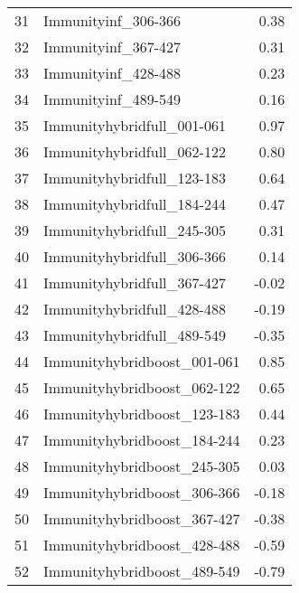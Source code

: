 \begin{table}[ht]
\begin{tabular}{rlr}
  31 & Immunityinf\_306-366 & 0.38 \\ 
  32 & Immunityinf\_367-427 & 0.31 \\ 
  33 & Immunityinf\_428-488 & 0.23 \\ 
  34 & Immunityinf\_489-549 & 0.16 \\ 
  35 & Immunityhybridfull\_001-061 & 0.97 \\ 
  36 & Immunityhybridfull\_062-122 & 0.80 \\ 
  37 & Immunityhybridfull\_123-183 & 0.64 \\ 
  38 & Immunityhybridfull\_184-244 & 0.47 \\ 
  39 & Immunityhybridfull\_245-305 & 0.31 \\ 
  40 & Immunityhybridfull\_306-366 & 0.14 \\ 
  41 & Immunityhybridfull\_367-427 & -0.02 \\ 
  42 & Immunityhybridfull\_428-488 & -0.19 \\ 
  43 & Immunityhybridfull\_489-549 & -0.35 \\ 
  44 & Immunityhybridboost\_001-061 & 0.85 \\ 
  45 & Immunityhybridboost\_062-122 & 0.65 \\ 
  46 & Immunityhybridboost\_123-183 & 0.44 \\ 
  47 & Immunityhybridboost\_184-244 & 0.23 \\ 
  48 & Immunityhybridboost\_245-305 & 0.03 \\ 
  49 & Immunityhybridboost\_306-366 & -0.18 \\ 
  50 & Immunityhybridboost\_367-427 & -0.38 \\ 
  51 & Immunityhybridboost\_428-488 & -0.59 \\ 
  52 & Immunityhybridboost\_489-549 & -0.79 \\ 
   \hline
\end{tabular}
\end{table}
